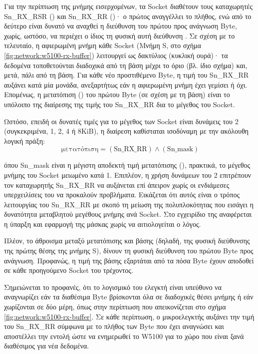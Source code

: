 Για την περίπτωση της μνήμης εισερχομένων, τα Socket διαθέτουν τους καταχωρητές
Sn\_RX\_RSR () και
Sn\_RX\_RR ()· ο πρώτος αναγγέλλει το πλήθος, ενώ
από το δεύτερο είναι δυνατό να αναχθεί η διεύθυνση του πρώτου προς ανάγνωση
Byte, χωρίς, ωστόσο, να περιέχει ο ίδιος τη φυσική αυτή διεύθυνση
\parencite[35--36]{wiz11:w5100}. Σε σχέση με το τελευταίο, η αφιερωμένη μνήμη
κάθε Socket (Μνήμη S, στο σχήμα \ref{fig:network:w5100-rx-buffer})
λειτουργεί ως δακτύλιος (κυκλική ουρά)· τα δεδομένα τοποθετούνται διαδοχικά από
τη βάση μέχρι το όριο (βλ. ίδιο σχήμα) και, μετά, πάλι από τη βάση.
Για κάθε νέο προστιθέμενο Byte, η τιμή του Sn\_RX\_RR αυξάνει κατά μία μονάδα,
ανεξαρτήτως εάν η αφιερωμένη μνήμη έχει γεμίσει ή όχι. Επομένως, η μετατόπιση
() του πρώτου Byte (σε σχέση με τη βάση) είναι το υπόλοιπο της
διαίρεσης της τιμής του Sn\_RX\_RR δια το μέγεθος του Socket.

Ωστόσο, επειδή οι δυνατές τιμές για το μέγεθος των Socket είναι δυνάμεις του 2
(συγκεκριμένα, 1, 2, 4 ή 8KiB), η διαίρεση καθίσταται ισοδύναμη με την ακόλουθη
λογική πράξη:
\begin{equation*}
\text{μετατόπιση} = (\text{Sn\_RX\_RR}) \land (\text{Sn\_mask})
\end{equation*}

\noindent
όπου Sn\_mask είναι η μέγιστη αποδεκτή τιμή μετατόπισης (), πρακτικά,
το μέγεθος μνήμης του Socket μειωμένο κατά 1. Επιπλέον, η χρήση δυνάμεων του 2
επιτρέπουν τον καταχωρητής Sn\_RX\_RR να αυξάνεται επί άπειρον χωρίς οι
ενδιάμεσες υπερχειλίσεις του να προκαλούν προβλήματα. Εικάζεται ότι αυτός είναι
ο τρόπος λειτουργίας του Sn\_RX\_RR με σκοπό τη μείωση της πολυπλοκότητας που
εισάγει η δυνατότητα μεταβλητού μεγέθους μνήμης ανά Socket. Στο εγχειρίδιο της
\textcite[35,43--44]{wiz11:w5100} αναφέρεται η ύπαρξη και εφαρμογή της μάσκας
χωρίς να αιτιολογείται ο λόγος.

Πλέον, το άθροισμα μεταξύ μετατόπισης και βάσης (δηλαδή, της φυσική διεύθυνσης
της πρώτης θέσης της μνήμης S), δίνουν τη φυσική διεύθυνση του πρώτου
Byte προς ανάγνωση. Προφανώς, η τιμή της βάσης εξαρτάται από τα πόσα Byte έχουν
αποδοθεί σε κάθε προηγούμενο Socket του τρέχοντος.

Σημειώνεται το προφανές, ότι το λογισμικό του ελεγκτή είναι υπεύθυνο να
αναγνωρίζει εάν τα διαθέσιμα Byte βρίσκονται όλα σε διαδοχικές θέσει μνήμης ή
εάν χωρίζονται σε δύο μέρη, όπως στην περίπτωση που απεικονίζεται στο σχήμα
\ref{fig:network:w5100-rx-buffer}. Σε κάθε περίπτωση, ο μικροελεγκτής αυξάνει
την τιμή του Sn\_RX\_RR σύμφωνα με το πλήθος των Byte που έχει αναγνώσει και
αποστέλλει την εντολή  ώστε να ενημερωθεί το W5100 για το χώρο που
είναι ξανά διαθέσιμος για νέα δεδομένα.

